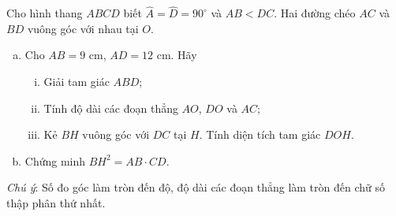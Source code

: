 \begin{bt}%
	 Cho hình thang $ABCD$ biết $\widehat{A}=\widehat{D}=90^\circ$ và $AB<DC$. Hai đường chéo $AC$ và $BD$ vuông góc với nhau tại $O$.
\begin{enumerate}[a)]
\item Cho $AB=9$ cm, $AD=12$ cm. Hãy
         \begin{enumerate}[i)]
         \item Giải tam giác $ABD$;
         \item Tính độ dài các đoạn thẳng $AO$, $DO$ và $AC$;
         \item  Kẻ $BH$ vuông góc với $DC$ tại $H$. Tính diện tích tam giác $DOH$.
         \end{enumerate}
\item Chứng minh $BH^2=AB\cdot CD$.
\end{enumerate}
\textit{Chú ý}: Số đo góc làm tròn đến độ, độ dài các đoạn thẳng làm tròn đến chữ số thập phân thứ nhất.
    \loigiai{

}
\end{bt}
